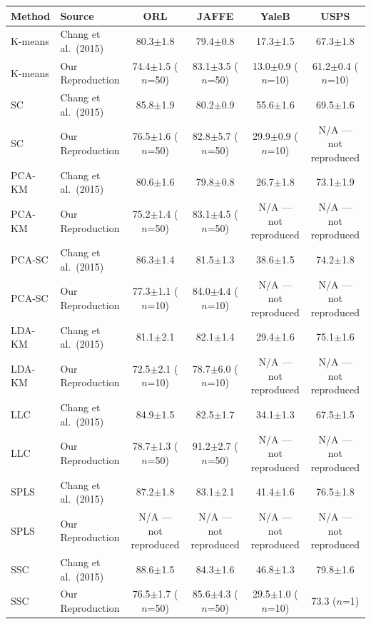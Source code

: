 \begin{tabular}{llcccc}
\toprule
Method & Source & ORL & JAFFE & YaleB & USPS \\
\midrule
K-means & Chang et al.\ (2015) & 80.3$\pm$1.8 & 79.4$\pm$0.8 & 17.3$\pm$1.5 & 67.3$\pm$1.8 \\
K-means & Our Reproduction & 74.4$\pm$1.5 ($n$=50) & 83.1$\pm$3.5 ($n$=50) & 13.0$\pm$0.9 ($n$=10) & 61.2$\pm$0.4 ($n$=10) \\
SC & Chang et al.\ (2015) & 85.8$\pm$1.9 & 80.2$\pm$0.9 & 55.6$\pm$1.6 & 69.5$\pm$1.6 \\
SC & Our Reproduction & 76.5$\pm$1.6 ($n$=50) & 82.8$\pm$5.7 ($n$=50) & 29.9$\pm$0.9 ($n$=10) & N/A --- not reproduced \\
PCA-KM & Chang et al.\ (2015) & 80.6$\pm$1.6 & 79.8$\pm$0.8 & 26.7$\pm$1.8 & 73.1$\pm$1.9 \\
PCA-KM & Our Reproduction & 75.2$\pm$1.4 ($n$=50) & 83.1$\pm$4.5 ($n$=50) & N/A --- not reproduced & N/A --- not reproduced \\
PCA-SC & Chang et al.\ (2015) & 86.3$\pm$1.4 & 81.5$\pm$1.3 & 38.6$\pm$1.5 & 74.2$\pm$1.8 \\
PCA-SC & Our Reproduction & 77.3$\pm$1.1 ($n$=10) & 84.0$\pm$4.4 ($n$=10) & N/A --- not reproduced & N/A --- not reproduced \\
LDA-KM & Chang et al.\ (2015) & 81.1$\pm$2.1 & 82.1$\pm$1.4 & 29.4$\pm$1.6 & 75.1$\pm$1.6 \\
LDA-KM & Our Reproduction & 72.5$\pm$2.1 ($n$=10) & 78.7$\pm$6.0 ($n$=10) & N/A --- not reproduced & N/A --- not reproduced \\
LLC & Chang et al.\ (2015) & 84.9$\pm$1.5 & 82.5$\pm$1.7 & 34.1$\pm$1.3 & 67.5$\pm$1.5 \\
LLC & Our Reproduction & 78.7$\pm$1.3 ($n$=50) & 91.2$\pm$2.7 ($n$=50) & N/A --- not reproduced & N/A --- not reproduced \\
SPLS & Chang et al.\ (2015) & 87.2$\pm$1.8 & 83.1$\pm$2.1 & 41.4$\pm$1.6 & 76.5$\pm$1.8 \\
SPLS & Our Reproduction & N/A --- not reproduced & N/A --- not reproduced & N/A --- not reproduced & N/A --- not reproduced \\
SSC & Chang et al.\ (2015) & 88.6$\pm$1.5 & 84.3$\pm$1.6 & 46.8$\pm$1.3 & 79.8$\pm$1.6 \\
SSC & Our Reproduction & 76.5$\pm$1.7 ($n$=50) & 85.6$\pm$4.3 ($n$=50) & 29.5$\pm$1.0 ($n$=10) & 73.3 ($n$=1) \\
\bottomrule
\end{tabular}
